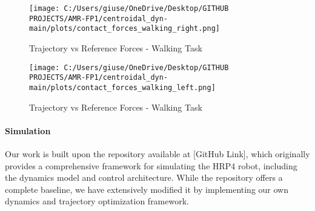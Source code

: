 \documentclass[main.tex]{subfiles}
\begin{document}
\begin{sloppypar}
\begin{figure}[htbp]
    \centering
    \texttt{[image: C:/Users/giuse/OneDrive/Desktop/GITHUB PROJECTS/AMR-FP1/centroidal\_dyn-main/plots/contact\_forces\_walking\_right.png]}
    \caption{Trajectory vs Reference Forces - Walking Task}
    \label{fig:contact_forces_walking_right}
\end{figure}
\begin{figure}[htbp]
    \centering
    \texttt{[image: C:/Users/giuse/OneDrive/Desktop/GITHUB PROJECTS/AMR-FP1/centroidal\_dyn-main/plots/contact\_forces\_walking\_left.png]}
    \caption{Trajectory vs Reference Forces - Walking Task}
    \label{fig:contact_forces_walking_left}
\end{figure}


\paragraph{Simulation} 
Our work is built upon the repository available at [GitHub Link], which originally provides a comprehensive framework for simulating the HRP4 robot, including the dynamics model and control architecture. While the repository offers a complete baseline, we have extensively modified it by implementing our own dynamics and trajectory optimization framework. \\

\end{sloppypar}
\end{document}
